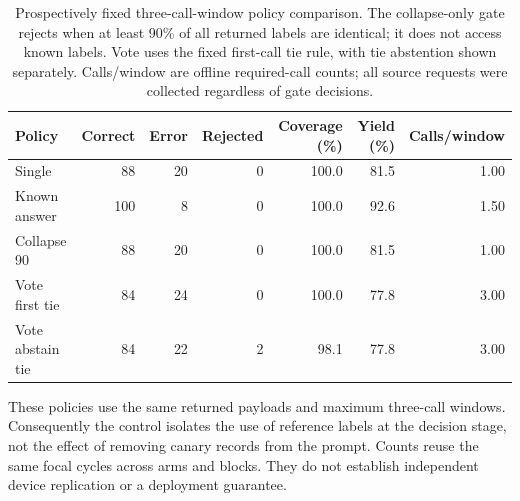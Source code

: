 \begin{table}[htbp]\centering\small
\caption{Prospectively fixed three-call-window policy comparison. The collapse-only gate rejects when at least 90\% of all returned labels are identical; it does not access known labels. Vote uses the fixed first-call tie rule, with tie abstention shown separately. Calls/window are offline required-call counts; all source requests were collected regardless of gate decisions.}
\label{tab:canary_controls_stability}
\begin{tabular}{lrrrrrr}\toprule
Policy & Correct & Error & Rejected & Coverage (\%) & Yield (\%) & Calls/window \\\midrule
Single & 88 & 20 & 0 & 100.0 & 81.5 & 1.00 \\
Known answer & 100 & 8 & 0 & 100.0 & 92.6 & 1.50 \\
Collapse 90 & 88 & 20 & 0 & 100.0 & 81.5 & 1.00 \\
Vote first tie & 84 & 24 & 0 & 100.0 & 77.8 & 3.00 \\
Vote abstain tie & 84 & 22 & 2 & 98.1 & 77.8 & 3.00 \\
\bottomrule\end{tabular}\end{table}
These policies use the same returned payloads and maximum three-call windows. Consequently the control isolates the use of reference labels at the decision stage, not the effect of removing canary records from the prompt. Counts reuse the same focal cycles across arms and blocks. They do not establish independent device replication or a deployment guarantee.
